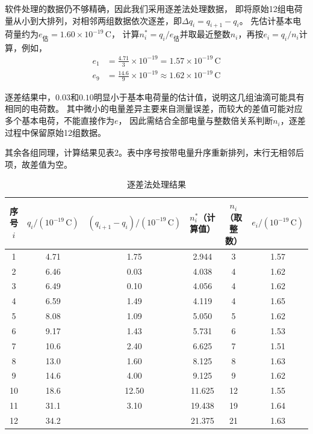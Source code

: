 \documentclass[10pt,a4paper]{ctexart} %
\begin{document}
  软件处理的数据仍不够精确，因此我们采用逐差法处理数据，
  即将原始12组电荷量从小到大排列，对相邻两组数据依次逐差，即$\Delta q_i=q_{i+1}-q_i$。
  先估计基本电荷量约为$e_{\text{估}}=1.60\times10^{-19}\,\mathrm{C}$，
  计算$n_i^*=q_i/e_{\text{估}}$并取最近整数$n_i$，再按$e_i=q_i/n_i$计算，例如，
  \[
    \begin{aligned}
      e_1&=\frac{4.71}{3}\times10^{-19}
          =1.57\times10^{-19}\,\mathrm{C} \\[0.5em]
      e_9&=\frac{14.6}{9}\times10^{-19}
          \approx1.62\times10^{-19}\,\mathrm{C}
    \end{aligned}
  \]
  
  逐差结果中，$0.03$和$0.10$明显小于基本电荷量的估计值，说明这几组油滴可能具有相同的电荷数。
  其中微小的电量差异主要来自测量误差，而较大的差值可能对应多个基本电荷，不能直接作为$e$，
  因此需结合全部电量与整数倍关系判断$n_i$，逐差过程中保留原始12组数据。

  其余各组同理，计算结果见表2。表中序号按带电量升序重新排列，末行无相邻后项，故差值为空。

  \begin{table}[H]
    \centering
    \caption{逐差法处理结果}
    \begin{tabular}{cccccc}
      \toprule
      序号 $i$ & $q_i/(10^{-19}\,\mathrm{C})$ & $(q_{i+1}-q_i)/(10^{-19}\,\mathrm{C})$
      & $n_i^*$（计算值） & $n_i$（取整数） & $e_i/(10^{-19}\,\mathrm{C})$ \\
      \midrule
      1 & 4.71 & 1.75 & 2.944 & 3 & 1.57 \\
      2 & 6.46 & 0.03 & 4.038 & 4 & 1.62 \\
      3 & 6.49 & 0.10 & 4.056 & 4 & 1.62 \\
      4 & 6.59 & 1.49 & 4.119 & 4 & 1.65 \\
      5 & 8.08 & 1.09 & 5.050 & 5 & 1.62 \\
      6 & 9.17 & 1.43 & 5.731 & 6 & 1.53 \\
      7 & 10.6 & 2.40 & 6.625 & 7 & 1.51 \\
      8 & 13.0 & 1.60 & 8.125 & 8 & 1.63 \\
      9 & 14.6 & 4.00 & 9.125 & 9 & 1.62 \\
      10 & 18.6 & 12.50 & 11.625 & 12 & 1.55 \\
      11 & 31.1 & 3.10 & 19.438 & 19 & 1.64 \\
      12 & 34.2 & & 21.375 & 21 & 1.63 \\
      \bottomrule
    \end{tabular}
  \end{table}
\end{document}
